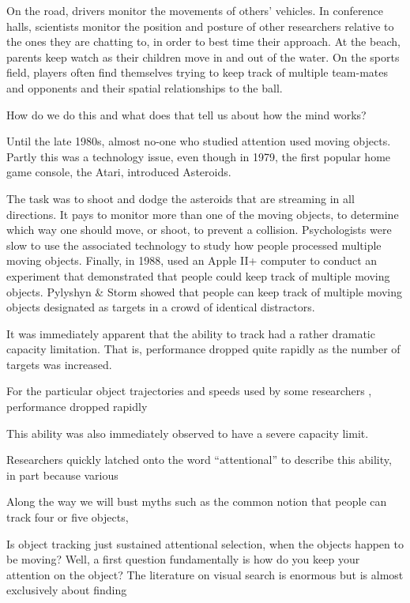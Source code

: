 \documentclass[]{book}
\begin{document}
On the road, drivers monitor the movements of others' vehicles. In conference halls, scientists monitor the position and posture of other researchers relative to the ones they are chatting to, in order to best time their approach. At the beach, parents keep watch as their children move in and out of the water. On the sports field, players often find themselves trying to keep track of multiple team-mates and opponents and their spatial relationships to the ball.

How do we do this and what does that tell us about how the mind works?

Until the late 1980s, almost no-one who studied attention used moving objects. Partly this was a technology issue, even though in 1979, the first popular home game console, the Atari, introduced Asteroids.

The task was to shoot and dodge the asteroids that are streaming in all directions. It pays to monitor more than one of the moving objects, to determine which way one should move, or shoot, to prevent a collision. Psychologists were slow to use the associated technology to study how people processed multiple moving objects. Finally, in 1988, \citet{pylyshynTrackingMultipleIndependent1988} used an Apple II+ computer to conduct an experiment that demonstrated that people could keep track of multiple moving objects. Pylyshyn \& Storm showed that people can keep track of multiple moving objects designated as targets in a crowd of identical distractors.

It was immediately apparent that the ability to track had a rather dramatic capacity limitation. That is, performance dropped quite rapidly as the number of targets was increased.

For the particular object trajectories and speeds used by some researchers
\citet{pylyshynTrackingMultipleIndependent1988}, performance dropped rapidly

This ability was also immediately observed to have a severe capacity limit.

Researchers quickly latched onto the word ``attentional'' to describe this ability,
in part because various

Along the way we will bust myths such as the common notion that people can track four or five objects,

Is object tracking just sustained attentional selection, when the objects happen to be moving? Well, a first question fundamentally is how do you keep your attention on the object? The literature on visual search is enormous but is almost exclusively about finding
\end{document}
